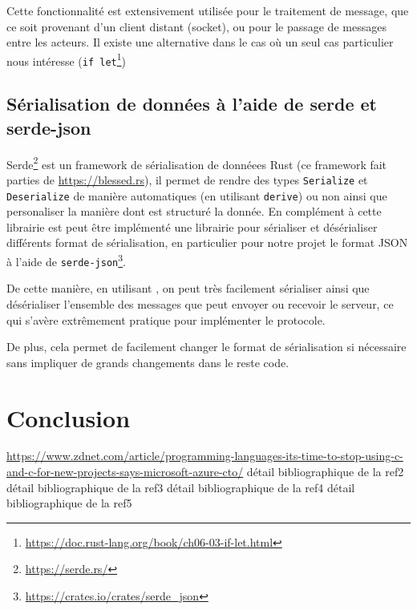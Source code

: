 \documentclass{EPUProjetDi}
\begin{document}
Cette fonctionnalité est extensivement utilisée pour le traitement de message, que ce soit provenant d'un client distant (socket), ou pour le passage de messages entre les acteurs. Il existe une alternative dans le cas où un seul cas particulier nous intéresse (\verb|if let|\footnote{\url{https://doc.rust-lang.org/book/ch06-03-if-let.html}})

\section{Sérialisation de données à l'aide de serde et serde-json}

Serde\footnote{\url{https://serde.rs/}} est un framework de sérialisation de donnéees Rust (ce framework fait parties de \url{https://blessed.rs}), il permet de rendre des types \verb|Serialize| et \verb|Deserialize| de manière automatiques (en utilisant \verb|derive|) ou non ainsi que personaliser la manière dont est structuré la donnée. En complément à cette librairie est peut être implémenté une librairie pour sérialiser et désérialiser différents format de sérialisation, en particulier pour notre projet le format JSON à l'aide de \verb|serde-json|\footnote{\url{https://crates.io/crates/serde_json}}.

De cette manière, en utilisant , on peut très facilement sérialiser ainsi que désérialiser l'ensemble des messages que peut envoyer ou recevoir le serveur, ce qui s'avère extrêmement pratique pour implémenter le protocole.

De plus, cela permet de facilement changer le format de sérialisation si nécessaire sans impliquer de grands changements dans le reste code.

\chapter*{Conclusion}

\label{sec:conclusion}

\begin{thebibliography}{99}
\label{sec:biblio}
  \url{https://www.zdnet.com/article/programming-languages-its-time-to-stop-using-c-and-c-for-new-projects-says-microsoft-azure-cto/}
  détail bibliographique de la ref2
  détail bibliographique de la ref3
  détail bibliographique de la ref4
  détail bibliographique de la ref5
\end{thebibliography}
\end{document}
